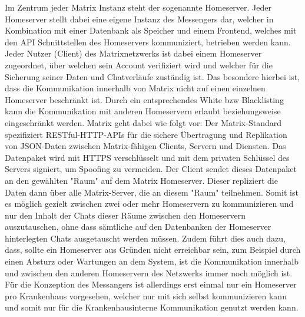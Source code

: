 Im Zentrum jeder Matrix Instanz steht der sogenannte Homeserver. Jeder Homeserver stellt dabei eine eigene Instanz des Messengers dar, welcher in Kombination mit einer Datenbank als Speicher und einem Frontend, welches mit den API Schnittstellen des Homeservers kommuniziert, betrieben werden kann. Jeder Nutzer (Client) des Matrixnetzwerks ist dabei einem Homeserver zugeordnet, über welchen sein Account verifiziert wird und welcher für die Sicherung seiner Daten und Chatverläufe zuständig ist. Das besondere hierbei ist, dass die Kommunikation innerhalb von Matrix nicht auf einen einzelnen Homeserver beschränkt ist. Durch ein entsprechendes White bzw Blacklisting kann die Kommunikation mit anderen Homeservern erlaubt beziehungsweise eingeschränkt werden. Matrix geht dabei wie folgt vor:
Der Matrix-Standard spezifiziert RESTful-HTTP-APIs für die sichere Übertragung und Replikation von JSON-Daten zwischen Matrix-fähigen Clients, Servern und Diensten. Das Datenpaket wird mit HTTPS verschlüsselt und mit dem privaten Schlüssel des Servers signiert, um Spoofing zu vermeiden.
Der Client sendet dieses Datenpaket an den gewählten "Raum" auf dem Matrix Homeserver. Dieser repliziert die Daten dann über alle Matrix-Server, die an diesem "Raum" teilnehmen. Somit ist es möglich gezielt zwischen zwei oder mehr Homeservern zu kommunizieren und nur den Inhalt der Chats dieser Räume zwischen den Homeservern auszutauschen, ohne dass sämtliche auf den Datenbanken der Homeserver hinterlegten Chats ausgetauscht werden müssen. Zudem führt dies auch dazu, dass, sollte ein Homeserver aus Gründen nicht erreichbar sein, zum Beispiel durch einen Absturz oder Wartungen an dem System, ist die Kommunikation innerhalb und zwischen den anderen Homeservern des Netzwerks immer noch möglich ist. Für die Konzeption des Messangers ist allerdings erst einmal nur ein Homeserver pro Krankenhaus vorgesehen, welcher nur mit sich selbst kommunizieren kann und somit nur für die Krankenhausinterne Kommunikation genutzt werden kann.


